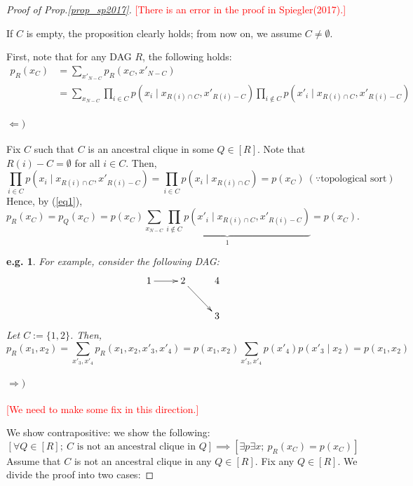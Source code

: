 \documentclass[11pt,a4paper,dvipdfmx]{article}
\theoremstyle{plain}
\newtheorem{eg}{e.g.}[section]
\newcommand{\ocomment}[1]{{\textcolor{red}{#1}}}
\begin{document}
\begin{proof}[Proof of Prop.\ref{prop_sp2017}]
	\ocomment{[There is an error in the proof in Spiegler(2017).]}
	
	If $C$ is empty, the proposition clearly holds; from now on, we assume  $C \neq \emptyset$.
	 
	First, note that for any DAG $R$, the following holds:
	\begin{align}
		p_R(x_C) &= \sum_{x'_{N-C}} p_R(x_C, x'_{N-C}) \nonumber \\
		&=  \sum_{x_{N-C}}
		\prod_{i \in C} p(x_i \mid x_{R(i) \cap C}, x'_{R(i) - C})
		\prod_{i \notin C} p(x'_i \mid x_{R(i) \cap C}, x'_{R(i) - C}) \label{eq1}
	\end{align}
	
	\paragraph{$\Leftarrow)$}
	Fix $C$ such that $C$ is an ancestral clique in some $Q \in [R]$. Note that $R(i) - C = \emptyset$ for all $i \in C$. Then,
	\[
	\prod_{i \in C} p(x_i \mid x_{R(i) \cap C}, x'_{R(i) - C})
	= \prod_{i \in C} p(x_i \mid x_{R(i) \cap C})
	= p(x_C) \ (\because \text{topological sort})
	\]
	Hence, by (\ref{eq1}),
	\[
	p_R(x_C) = p_Q(x_C) = p(x_C)
	\underbrace{\sum_{x_{N-C}}
		\prod_{i \notin C} p(x'_i \mid x_{R(i) \cap C}, x'_{R(i) - C})}_{1} = p(x_C).
	\]
	
	\begin{screen}
	\begin{eg}
		For example, consider the following DAG:
		\[
		\xymatrix{
			1 \ar[r] & 2 \ar[rd] & 4 \\
			& & 3
		}
		\]
		Let $C:=\{1,2\}$. Then,
		\[
		p_R(x_1, x_2) = 
		\sum_{x'_3, x'_4} p_R(x_1, x_2, x'_3, x'_4)
		= p(x_1, x_2) \sum_{x'_3, x'_4} p(x'_4) p(x'_3 \mid x_2)
		= p(x_1, x_2)
		\]
	\end{eg}
	\end{screen}
	
	\paragraph{$\Rightarrow)$}
	\ocomment{[We need to make some fix in this direction.]}
	
	We show contrapositive: we show the following:
	\[
	[\forall Q \in [R]; \ C \text{ is not an ancestral clique in } Q]
	\implies
	[\exists p  \exists x; \ p_R(x_C) = p(x_C)]
	\]
	Assume that $C$ is not an ancestral clique in any $Q \in [R]$.
	Fix any $Q \in [R]$.
	We divide the proof into two cases:

\end{proof}
\end{document}
